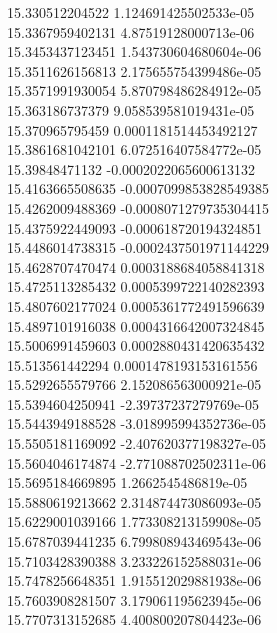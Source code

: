 {15.330512204522 1.124691425502533e-05 \\
15.3367959402131 4.87519128000713e-06 \\
15.3453437123451 1.543730604680604e-06 \\
15.3511626156813 2.175655754399486e-05 \\
15.3571991930054 5.870798486284912e-05 \\
15.363186737379 9.058539581019431e-05 \\
15.370965795459 0.0001181514453492127 \\
15.3861681042101 6.072516407584772e-05 \\
15.39848471132 -0.0002022065600613132 \\
15.4163665508635 -0.0007099853828549385 \\
15.4262009488369 -0.0008071279735304415 \\
15.4375922449093 -0.000618720194324851 \\
15.4486014738315 -0.0002437501971144229 \\
15.4628707470474 0.0003188684058841318 \\
15.4725113285432 0.0005399722140282393 \\
15.4807602177024 0.0005361772491596639 \\
15.4897101916038 0.0004316642007324845 \\
15.5006991459603 0.0002880431420635432 \\
15.513561442294 0.0001478193153161556 \\
15.5292655579766 2.152086563000921e-05 \\
15.5394604250941 -2.39737237279769e-05 \\
15.5443949188528 -3.018995994352736e-05 \\
15.5505181169092 -2.407620377198327e-05 \\
15.5604046174874 -2.771088702502311e-06 \\
15.5695184669895 1.2662545486819e-05 \\
15.5880619213662 2.314874473086093e-05 \\
15.6229001039166 1.773308213159908e-05 \\
15.6787039441235 6.799808943469543e-06 \\
15.7103428390388 3.233226152588031e-06 \\
15.7478256648351 1.915512029881938e-06 \\
15.7603908281507 3.179061195623945e-06 \\
15.7707313152685 4.400800207804423e-06 \\
}
